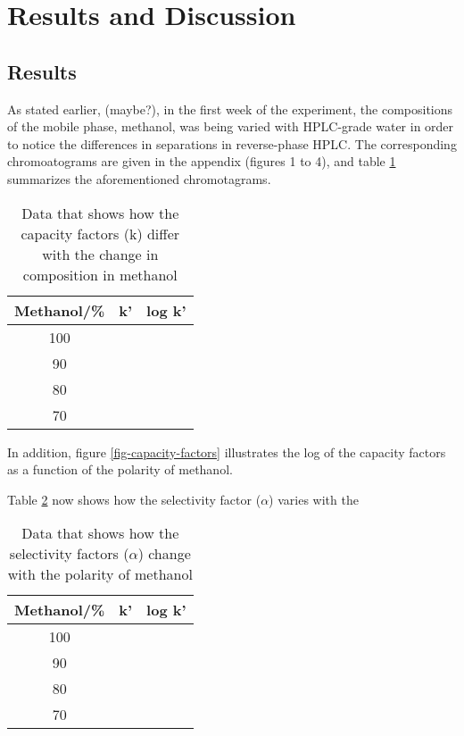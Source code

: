 \documentclass[a4paper, 12pt]{article}
\begin{document}
\section{Results and Discussion}

\subsection{Results}
As stated earlier, (maybe?), in the first week of the experiment, the compositions of the mobile phase, methanol, was being varied with HPLC-grade water in order to notice the differences in separations in reverse-phase HPLC. The corresponding chromoatograms are given in the appendix (figures 1 to 4), and table \ref{tab-capacity-factors} summarizes the aforementioned chromotagrams.

\begin{table}[h!]
	\centering
	\begin{tabular}{|c|c|c|}
		\hline
		Methanol/\% & k' & log k' \\
		\hline
		100 & & \\
		\hline
		90 & & \\
		\hline
		80 & & \\
		\hline
		70 & & \\
		\hline
	\end{tabular}
	\caption{Data that shows how the capacity factors (k) differ with the change in composition in methanol}
	\label{tab-capacity-factors}
\end{table}

In addition, figure \ref{fig-capacity-factors} illustrates the log of the capacity factors as a function of the polarity of methanol.

Table \ref{tab-selectivity} now shows how the selectivity factor ($\alpha$) varies with the 

\begin{table}[h!]
	\centering
	\begin{tabular}{|c|c|c|}
		\hline
		Methanol/\% & k' & log k' \\
		\hline
		100 & & \\
		\hline
		90 & & \\
		\hline
		80 & & \\
		\hline
		70 & & \\
		\hline
	\end{tabular}
	\caption{Data that shows how the selectivity factors ($\alpha$) change with the polarity of methanol}
	\label{tab-selectivity}
\end{table}
\end{document}
